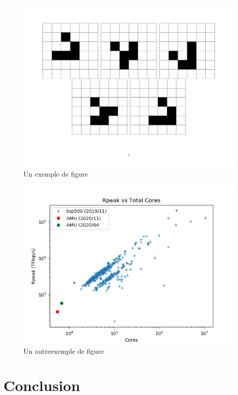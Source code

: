 \documentclass[11pt,a4paper]{article}
\begin{document}
\begin{figure}[tbh]
\centering
\includegraphics[width=.8\textwidth]{gol_image}
\caption{\label{fig:gol} Un exemple de figure}
\end{figure}

\lipsum[8]

\begin{figure}[tbh]
\centering
\includegraphics[width=.5\textwidth]{rpeak}
\caption{\label{fig:repeak} Un autreexemple de figure}
\end{figure}

\lipsum[9]

\section{Conclusion}
\lipsum[10]




\end{document}
